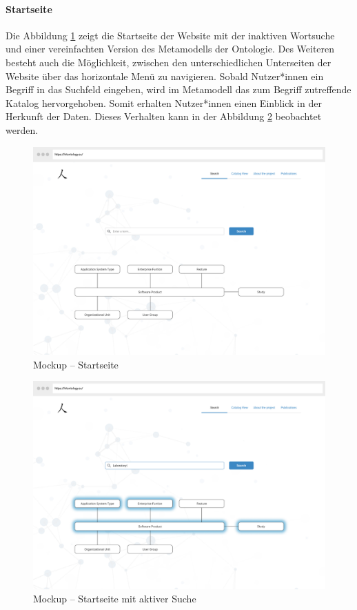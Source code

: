 \paragraph{Startseite}

Die Abbildung \ref{fig:mockup_start1} zeigt die Startseite der Website mit der inaktiven Wortsuche und einer vereinfachten Version des Metamodells der Ontologie.
Des Weiteren besteht auch die Möglichkeit, zwischen den unterschiedlichen Unterseiten der Website über das horizontale Menü zu navigieren.
Sobald Nutzer*innen ein Begriff in das Suchfeld eingeben, wird im Metamodell das zum Begriff zutreffende Katalog hervorgehoben.
Somit erhalten Nutzer*innen einen Einblick in der Herkunft der Daten.
Dieses Verhalten kann in der Abbildung \ref{fig:mockup_start2} beobachtet werden.

\begin{figure}[H]
	\centering
    	\includegraphics[width=1.45\textwidth, angle=90]{Images/Mockup_Startseite_1}
   	\caption[Mockup -- Startseite]{Mockup -- Startseite}
   	\label{fig:mockup_start1}
\end{figure}

\clearpage

\begin{figure}[H]
	\centering
    	\includegraphics[width=1.45\textwidth, angle=-90]{Images/Mockup_Startseite_2}
   	\caption[Mockup -- Startseite mit aktiver Suche]{Mockup -- Startseite mit aktiver Suche}
   	\label{fig:mockup_start2}
\end{figure}

